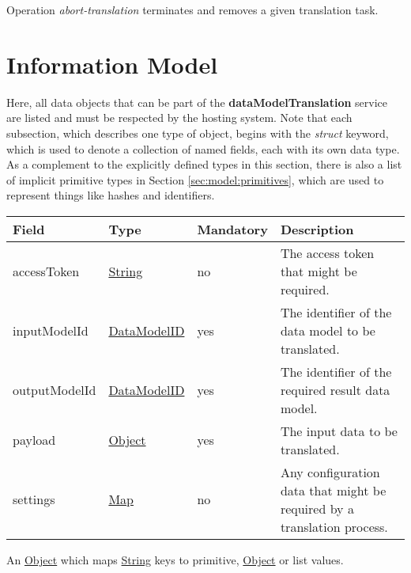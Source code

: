 \documentclass[a4paper]{arrowhead}
\newcommand{\pref}[1]{{\textcolor{ArrowheadGrey}{\hyperref[sec:model:primitives:#1]{#1}}}}
\begin{document}

Operation \textit{abort-translation} terminates and removes a given translation task.

\clearpage

\section{Information Model}
\label{sec:model}

Here, all data objects that can be part of the \textbf{dataModelTranslation} service are listed and must be respected by the hosting system.
Note that each subsection, which describes one type of object, begins with the \textit{struct} keyword, which is used to denote a collection of named fields, each with its own data type.
As a complement to the explicitly defined types in this section, there is also a list of implicit primitive types in Section \ref{sec:model:primitives}, which are used to represent things like hashes and identifiers.

{}
 
\begin{table}[ht!]
\begin{tabularx}{\textwidth}{| p{3.6cm} | p{4.9cm} | p{2cm} | X |} \hline
\rowcolor{gray!33} Field & Type & Mandatory & Description \\ \hline
accessToken & \pref{String} & no & The access token that might be required. \\ \hline
inputModelId & \pref{DataModelID} & yes & The identifier of the data model to be translated. \\ \hline
outputModelId & \pref{DataModelID} & yes & The identifier of the required result data model. \\ \hline
payload & \pref{Object} & yes & The input data to be translated. \\ \hline
settings & \hyperref[sec:model:Map]{Map}  & no & Any configuration data that might be required by a translation process. \\ \hline
\end{tabularx}
\end{table}


An \pref{Object} which maps \pref{String} keys to primitive, \pref{Object} or list values.

 
\end{document}
